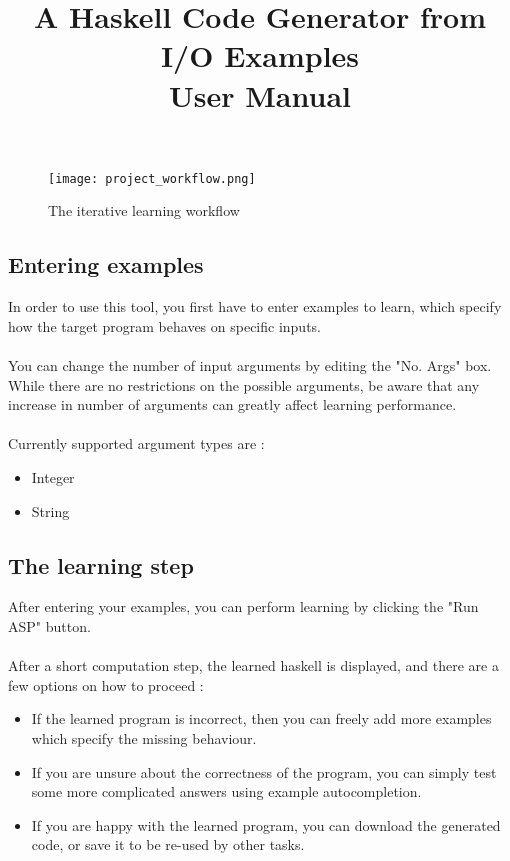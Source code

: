 \documentclass[a4paper]{article}
\title{A Haskell Code Generator from I/O Examples 
\\ User Manual}
\date{\vspace{-5ex}}
\begin{document}
\maketitle


\begin{figure}[h]
\texttt{[image: project\_workflow.png]}
\caption{The iterative learning workflow}
\end{figure}

\subsection*{Entering examples}

In order to use this tool, you first have to enter examples to learn, which specify how the target program behaves on specific inputs.\\ \\
You can change the number of input arguments by editing the "No. Args" box. While there are no restrictions on the possible arguments, be aware that any increase in number of arguments can greatly affect learning performance. \\ \\
Currently supported argument types are :

\begin{itemize}
\item Integer
\item String
\end{itemize}

\subsection*{The learning step}

After entering your examples, you can perform learning by clicking the "Run ASP" button. \\ \\
After a short computation step, the learned haskell is displayed, and there are a few options on how to proceed : 

\begin{itemize}
\item If the learned program is incorrect, then you can freely add more examples which specify the missing behaviour.
\item If you are unsure about the correctness of the program, you can simply test some more complicated answers using example autocompletion.
\item If you are happy with the learned program, you can download the generated code, or save it to be re-used by other tasks.
\end{itemize}  
\end{document}
